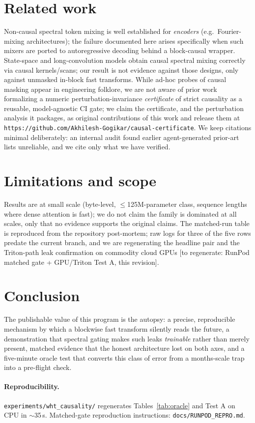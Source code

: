 \documentclass[11pt]{article}
\newcommand{\todoev}[1]{\textcolor{red!70!black}{[to regenerate: #1]}}
\begin{document}
\section{Related work}
Non-causal spectral token mixing is well established for \emph{encoders}
(e.g.\ Fourier-mixing architectures); the failure documented here arises
specifically when such mixers are ported to autoregressive decoding behind a
block-causal wrapper. State-space and long-convolution models obtain causal
spectral mixing correctly via causal kernels/scans; our result is not evidence
against those designs, only against unmasked in-block fast transforms. While
ad-hoc probes of causal masking appear in engineering folklore, we are not
aware of prior work formalizing a numeric perturbation-invariance
\emph{certificate} of strict causality as a reusable, model-agnostic CI gate;
we claim the certificate, and the perturbation analysis it packages, as
original contributions of this work and release them at
\texttt{https://github.com/Akhilesh-Gogikar/causal-certificate}. We keep
citations minimal deliberately: an internal audit found earlier agent-generated
prior-art lists unreliable, and we cite only what we have verified.

\section{Limitations and scope}
Results are at small scale (byte-level, $\le$125M-parameter class, sequence
lengths where dense attention is fast); we do not claim the family is dominated
at all scales, only that no evidence supports the original claims. The matched-run
table is reproduced from the repository post-mortem; raw logs for three of the
five rows predate the current branch, and we are regenerating the headline pair
and the Triton-path leak confirmation on commodity cloud GPUs
\todoev{RunPod matched gate + GPU/Triton Test A, this revision}.

\section{Conclusion}
The publishable value of this program is the autopsy: a precise, reproducible
mechanism by which a blockwise fast transform silently reads the future, a
demonstration that spectral gating makes such leaks \emph{trainable} rather
than merely present, matched evidence that the honest architecture lost on both
axes, and a five-minute oracle test that converts this class of error from a
months-scale trap into a pre-flight check.

\paragraph{Reproducibility.} \texttt{experiments/wht\_causality/} regenerates
Tables~\ref{tab:oracle} and Test A on CPU in $\sim$35\,s. Matched-gate
reproduction instructions: \texttt{docs/RUNPOD\_REPRO.md}.
\end{document}
